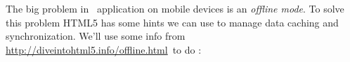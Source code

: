 \clearpage{}\label{lsoffline}

The big problem in \js\ application on mobile devices is an \emph{offline mode}.
To solve this problem HTML5 has some hints we can use to manage data caching and
synchronization. We'll use some info from
\url{http://diveintohtml5.info/offline.html}\ to do :
\begin{lstlistong}

\end{lstlistong}
